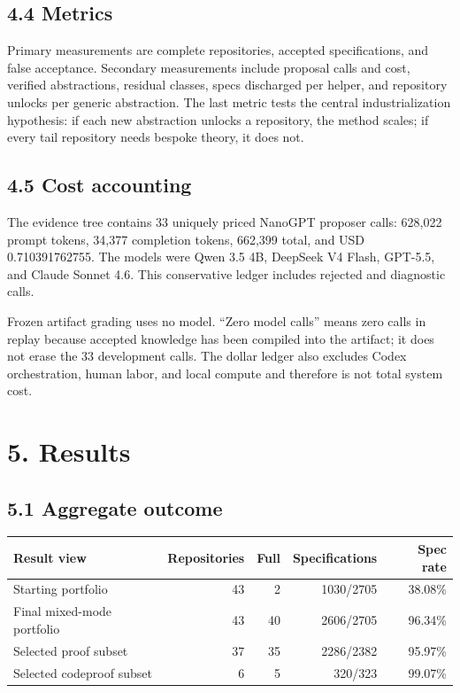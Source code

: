 \documentclass[
  10pt,
]{article}
\begin{document}
\subsection{4.4 Metrics}\label{metrics}

Primary measurements are complete repositories, accepted specifications,
and false acceptance. Secondary measurements include proposal calls and
cost, verified abstractions, residual classes, specs discharged per
helper, and repository unlocks per generic abstraction. The last metric
tests the central industrialization hypothesis: if each new abstraction
unlocks a repository, the method scales; if every tail repository needs
bespoke theory, it does not.

\subsection{4.5 Cost accounting}\label{cost-accounting}

The evidence tree contains 33 uniquely priced NanoGPT proposer calls:
628,022 prompt tokens, 34,377 completion tokens, 662,399 total, and USD
0.710391762755. The models were Qwen 3.5 4B, DeepSeek V4 Flash, GPT-5.5,
and Claude Sonnet 4.6. This conservative ledger includes rejected and
diagnostic calls.

Frozen artifact grading uses no model. ``Zero model calls'' means zero
calls in replay because accepted knowledge has been compiled into the
artifact; it does not erase the 33 development calls. The dollar ledger
also excludes Codex orchestration, human labor, and local compute and
therefore is not total system cost.

\section{5. Results}\label{results}

\subsection{5.1 Aggregate outcome}\label{aggregate-outcome}

\begin{longtable}[]{@{}lrrrr@{}}
\toprule\noalign{}
Result view & Repositories & Full & Specifications & Spec rate \\
\midrule\noalign{}
\endhead
\bottomrule\noalign{}
\endlastfoot
Starting portfolio & 43 & 2 & 1030/2705 & 38.08\% \\
Final mixed-mode portfolio & 43 & 40 & 2606/2705 & 96.34\% \\
Selected proof subset & 37 & 35 & 2286/2382 & 95.97\% \\
Selected codeproof subset & 6 & 5 & 320/323 & 99.07\% \\
\end{longtable}
\end{document}
